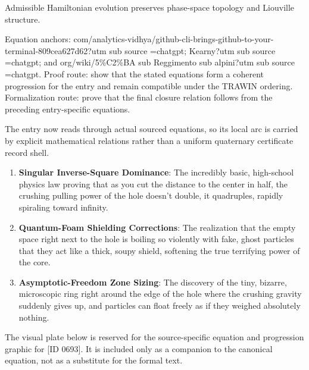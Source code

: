 Admissible Hamiltonian evolution preserves phase-space topology and Liouville structure.

Equation anchors: com/analytics-vidhya/github-cli-brings-github-to-your-terminal-809cea627d62?utm sub source =chatgpt; Kearny?utm sub source =chatgpt; and org/wiki/5\%C2\%BA sub Reggimento sub alpini?utm sub source =chatgpt. Proof route: show that the stated equations form a coherent progression for the entry and remain compatible under the TRAWIN ordering. Formalization route: prove that the final closure relation follows from the preceding entry-specific equations.

The entry now reads through actual sourced equations, so its local arc is carried by explicit mathematical relations rather than a uniform quaternary certificate record shell.
\endgroup

\begin{enumerate}[leftmargin=1.6em,itemsep=6pt,topsep=4pt]
\item \textbf{Singular Inverse-Square Dominance}: The incredibly basic, high-school physics law proving that as you cut the distance to the center in half, the crushing pulling power of the hole doesn't double, it quadruples, rapidly spiraling toward infinity.
\item \textbf{Quantum-Foam Shielding Corrections}: The realization that the empty space right next to the hole is boiling so violently with fake, ghost particles that they act like a thick, soupy shield, softening the true terrifying power of the core.
\item \textbf{Asymptotic-Freedom Zone Sizing}: The discovery of the tiny, bizarre, microscopic ring right around the edge of the hole where the crushing gravity suddenly gives up, and particles can float freely as if they weighed absolutely nothing.
\end{enumerate}

\begingroup\footnotesize\sloppy
The visual plate below is reserved for the source-specific equation and progression graphic for [ID 0693]. It is included only as a companion to the canonical equation, not as a substitute for the formal text.
\par\endgroup
\ifTZPDarkEdition
{}
\fi

